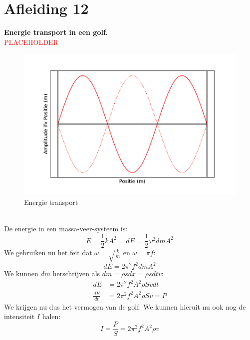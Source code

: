 \documentclass[a4paper,kul]{kulakarticle} %
\begin{document}
\section{Afleiding 12}
\textbf{Energie transport in een golf.}\\
\textcolor{red}{PLACEHOLDER}
\begin{figure}[h]
	\centering
	\includegraphics[width=0.7\linewidth]{Derde_harm}
	\caption[Energie transport]{Energie transport}
	\label{fig:energietransport}
\end{figure}\\
De energie in een massa-veer-systeem is:
\begin{equation*}
	E = \frac{1}{2}kA^2 = dE = \frac{1}{2}\omega^2dmA^2
\end{equation*}
We gebruiken nu het feit dat $\omega = \sqrt{\frac{k}{m}} $ en $\omega = \pi f$:
\begin{equation*}
	dE = 2\pi^2f^2dmA^2
\end{equation*}
We kunnen $dm$ herschrijven als $dm = \rho sdx = \rho sdtv$:
\begin{align*}
	dE &= 2\pi^2f^2A^2\rho Svdt\\
	\frac{dE}{dt} &= 2\pi^2f^2A^2\rho Sv = P
\end{align*}
We krijgen nu dus het vermogen van de golf. We kunnen hieruit nu ook nog de intensiteit $I$ halen:
\begin{equation*}
	I = \frac{P}{S} = 2\pi^2f^2A^2\rho v
\end{equation*}
\newpage
\end{document}
